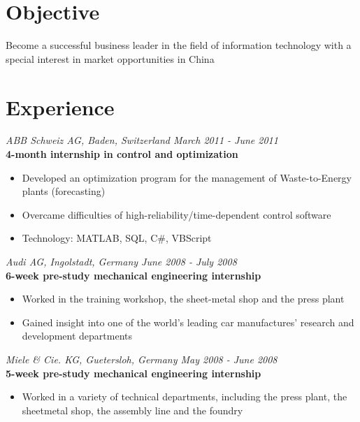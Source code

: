 \documentclass[margin]{res}
\begin{document}
 
 
 
\begin{resume} 
 
\section{Objective} 
Become a successful business leader in the field of information technology with a special 
interest in market opportunities in China 
 
\section{Experience}
  {\it ABB Schweiz AG, Baden, Switzerland \hfill March 2011 - June 2011} \\
  {\bf 4-month internship in control and optimization}
  \begin{itemize} \itemsep -0.5pt  %
  \item Developed an optimization program for the management of Waste-to-Energy plants (forecasting)
  \item Overcame difficulties of high-reliability/time-dependent control software
  \item Technology: MATLAB, SQL, C\#, VBScript
  \end{itemize}
  {\it Audi AG, Ingolstadt, Germany \hfill June 2008 - July 2008} \\
  {\bf 6-week pre-study mechanical engineering internship}
  \begin{itemize} \itemsep -0.5pt  %
  \item Worked in the training workshop, the sheet-metal shop and the press plant
  \item Gained insight into one of the world’s leading car manufactures’ research and development departments
  \end{itemize}
  {\it Miele \& Cie. KG, Guetersloh, Germany \hfill May 2008 - June 2008} \\
  {\bf 5-week pre-study mechanical engineering internship}
  \begin{itemize} \itemsep -0.5pt
  \item Worked in a variety of technical departments, including the press plant, the sheetmetal shop, the assembly line and the foundry

\end{itemize}
\end{resume}
\end{document}
